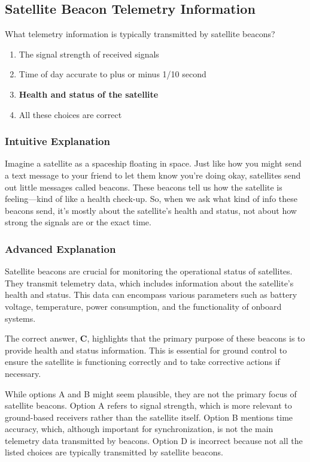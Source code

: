 \subsection{Satellite Beacon Telemetry Information}
\label{T8B01}

\begin{tcolorbox}[colback=gray!10!white,colframe=black!75!black,title=T8B01]
What telemetry information is typically transmitted by satellite beacons?
\begin{enumerate}[label=\Alph*)]
    \item The signal strength of received signals
    \item Time of day accurate to plus or minus 1/10 second
    \item \textbf{Health and status of the satellite}
    \item All these choices are correct
\end{enumerate}
\end{tcolorbox}

\subsubsection{Intuitive Explanation}
Imagine a satellite as a spaceship floating in space. Just like how you might send a text message to your friend to let them know you're doing okay, satellites send out little messages called beacons. These beacons tell us how the satellite is feeling—kind of like a health check-up. So, when we ask what kind of info these beacons send, it's mostly about the satellite's health and status, not about how strong the signals are or the exact time.

\subsubsection{Advanced Explanation}
Satellite beacons are crucial for monitoring the operational status of satellites. They transmit telemetry data, which includes information about the satellite's health and status. This data can encompass various parameters such as battery voltage, temperature, power consumption, and the functionality of onboard systems. 

The correct answer, \textbf{C}, highlights that the primary purpose of these beacons is to provide health and status information. This is essential for ground control to ensure the satellite is functioning correctly and to take corrective actions if necessary. 

While options A and B might seem plausible, they are not the primary focus of satellite beacons. Option A refers to signal strength, which is more relevant to ground-based receivers rather than the satellite itself. Option B mentions time accuracy, which, although important for synchronization, is not the main telemetry data transmitted by beacons. Option D is incorrect because not all the listed choices are typically transmitted by satellite beacons.

